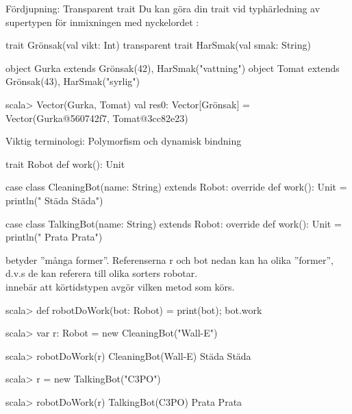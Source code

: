        
  

\begin{Slide}{Fördjupning: Transparent trait}\SlideFontSmall
Du kan göra din trait  vid typhärledning av supertypen för inmixningen med nyckelordet :
\begin{Code}
trait Grönsak(val vikt: Int)
transparent trait HarSmak(val smak: String)

object Gurka extends Grönsak(42), HarSmak("vattning")
object Tomat extends Grönsak(43), HarSmak("syrlig")
\end{Code} 
\begin{REPLnonum}
scala> Vector(Gurka, Tomat)
val res0: Vector[Grönsak] = 
  Vector(Gurka@560742f7, Tomat@3cc82e23)
\end{REPLnonum}
\end{Slide}
  

\begin{Slide}{Viktig terminologi: Polymorfism och dynamisk bindning}\SlideFontTiny
\begin{Code}[basicstyle=\SlideFontSize{6.2}{7.5}\ttfamily\selectfont]
trait Robot { def work(): Unit }

case class CleaningBot(name: String) extends Robot:
  override def work(): Unit = println(" Städa Städa")

case class TalkingBot(name: String) extends Robot:
  override def work(): Unit = println(" Prata Prata")
\end{Code}
 betyder ''många former''. Referenserna r och bot nedan kan ha olika ''former'', d.v.s de kan referera till olika sorters robotar. \\  innebär att körtidstypen avgör vilken metod som körs.
\begin{REPL}[numbers=left, basicstyle=\color{white}\SlideFontSize{6.2}{7.5}\ttfamily\selectfont]
scala> def robotDoWork(bot: Robot) = { print(bot); bot.work }

scala> var r: Robot = new CleaningBot("Wall-E")

scala> robotDoWork(r)
CleaningBot(Wall-E) Städa Städa

scala> r = new TalkingBot("C3PO")

scala> robotDoWork(r)
TalkingBot(C3PO) Prata Prata
\end{REPL}
\end{Slide}


